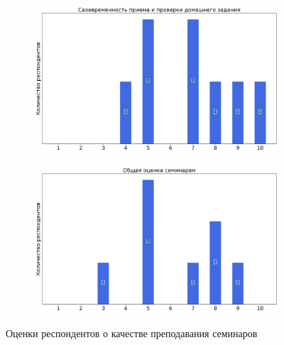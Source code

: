 \begin{figure}[H]
\begin{subfigure}[b]{0.45\textwidth}
			\end{subfigure}
			\begin{subfigure}[b]{0.45\textwidth}
				\centering
				\includegraphics[width=\textwidth]{images/4 course/Введение в машинное обучение/seminarists-marks-Грабовой А.-2.png}
			\end{subfigure}
			\begin{subfigure}[b]{0.45\textwidth}
				\centering
				\includegraphics[width=\textwidth]{images/4 course/Введение в машинное обучение/seminarists-marks-Грабовой А.-3.png}
			\end{subfigure}	
			\caption{Оценки респондентов о качестве преподавания семинаров}
		\end{figure}

